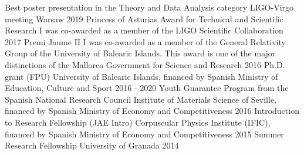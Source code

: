 \begin{cvpress}
 \cvpres
    {Best poster presentation in the Theory and Data Analysis category}
    {LIGO-Virgo meeting Warsaw}
    {2019}
    \cvpres
    {Princess of Asturias Award for Technical and Scientific Research}
    {I was co-awarded as a member of the LIGO Scientific Collaboration}
    {2017}
    \cvpres
    {Premi Jaume II}
    {I was co-awarded as a member of the General Relativity Group of the University of Balearic Islands. This award is one of the major distinctions of the Mallorca Government for Science and Research}
    {2016}
    \cvpres
    {Ph.D. grant (FPU)}
    {University of Balearic Islands, financed by Spanish Ministry of Education, Culture and Sport}
    {2016 - 2020}
    \cvpres
    {Youth Guarantee Program from the Spanish National Research Council}
    {Institute of Materials Science of Seville, financed by Spanish Ministry of Economy and Competitiveness}
    {2016}
    \cvpres
    {Introduction to Research Fellowship (JAE Intro)}
    {Corpuscular Physics Institute (IFIC), financed by Spanish Ministry of Economy and Competitiveness}
    {2015}
    \cvpres
    {Summer Research Fellowship}
    {University of Granada}
    {2014}
\end{cvpress}

